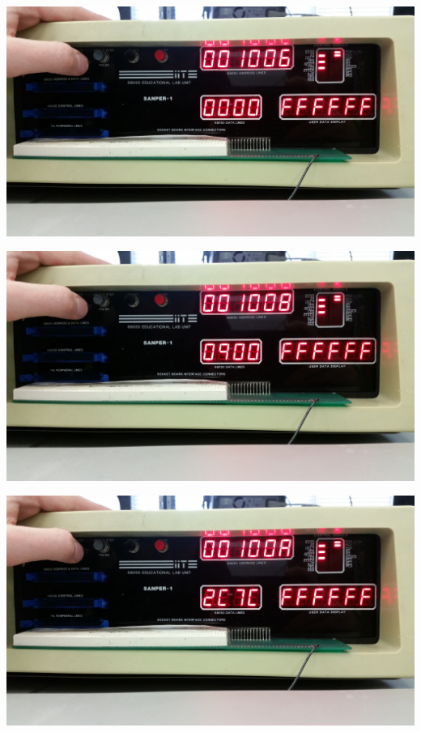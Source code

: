 \documentclass[12pt, twocolumn]{article}
\begin{document}
\begin{center}
\includegraphics[width=1\linewidth]{Lab1/20150120_093603}
\end{center}
\begin{center}
\includegraphics[width=1\linewidth]{Lab1/20150120_093605}
\end{center}
\begin{center}
\includegraphics[width=1\linewidth]{Lab1/20150120_093608}
\end{center}
\end{document}
